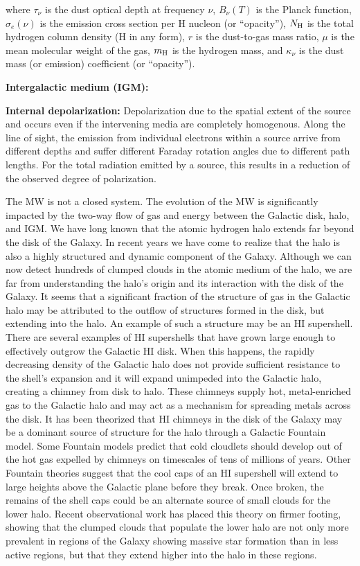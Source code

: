\documentclass[a4paper,10pt]{article}
\begin{document}
{\noindent}where $\tau_\nu$ is the dust optical depth at frequency $\nu$, $B_\nu(T)$ is the Planck function, $\sigma_e(\nu)$ is the emission cross section per H nucleon (or ``opacity''), $N_{\rm H}$ is the total hydrogen column density (H in any form), $r$ is the dust-to-gas mass ratio, $\mu$ is the mean molecular weight of the gas, $m_{\rm H}$ is the hydrogen mass, and $\kappa_\nu$ is the dust mass (or emission) coefficient (or ``opacity'').

{\noindent}\textbf{Intergalactic medium (IGM):} 

{\noindent}\textbf{Internal depolarization:} Depolarization due to the spatial extent of the source and occurs even if the intervening media are completely homogenous. Along the line of sight, the emission from individual electrons within a source arrive from different depths and suffer different Faraday rotation angles due to different path lengths. For the total radiation emitted by a source, this results in a reduction of the observed degree of polarization.

{\noindent}The MW is not a closed system. The evolution of the MW is significantly impacted by the two-way flow of gas and energy between the Galactic disk, halo, and IGM. We have long known that the atomic hydrogen halo extends far beyond the disk of the Galaxy. In recent years we have come to realize that the halo is also a highly structured and dynamic component of the Galaxy. Although we can now detect hundreds of clumped clouds in the atomic medium of the halo, we are far from understanding the halo's origin and its interaction with the disk of the Galaxy. It seems that a significant fraction of the structure of gas in the Galactic halo may be attributed to the outflow of structures formed in the disk, but extending into the halo. An example of such a structure may be an HI supershell. There are several examples of HI supershells that have grown large enough to effectively outgrow the Galactic HI disk. When this happens, the rapidly decreasing density of the Galactic halo does not provide sufficient resistance to the shell's expansion and it will expand unimpeded into the Galactic halo, creating a chimney from disk to halo. These chimneys supply hot, metal-enriched gas to the Galactic halo and may act as a mechanism for spreading metals across the disk. It has been theorized that HI chimneys in the disk of the Galaxy may be a dominant source of structure for the halo through a Galactic Fountain model. Some Fountain models predict that cold cloudlets should develop out of the hot gas expelled by chimneys on timescales of tens of millions of years. Other Fountain theories suggest that the cool caps of an HI supershell will extend to large heights above the Galactic plane before they break. Once broken, the remains of the shell caps could be an alternate source of small clouds for the lower halo. Recent observational work has placed this theory on firmer footing, showing that the clumped clouds that populate the lower halo are not only more prevalent in regions of the Galaxy showing massive star formation than in less active regions, but that they extend higher into the halo in these regions. 
\end{document}
